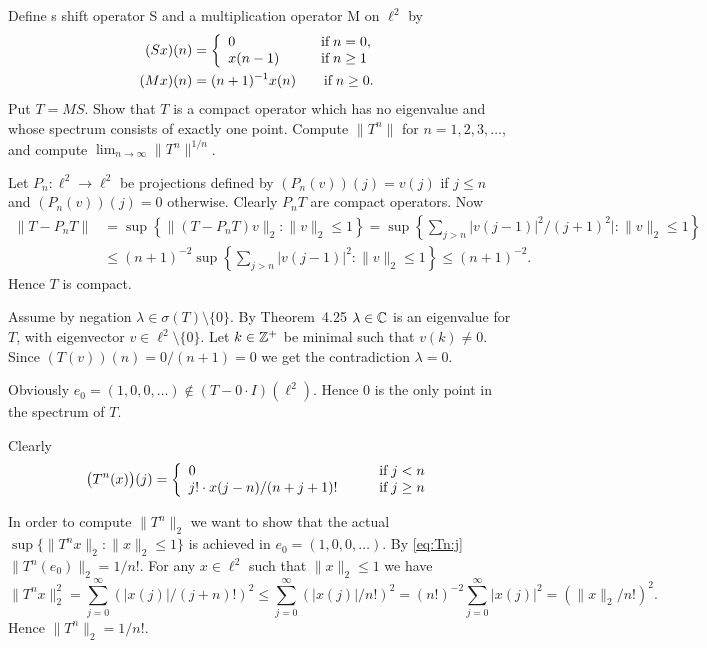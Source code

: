 \begin{enumerate}
\begin{excopy}
Define s shift operator S and a multiplication operator M on \(\ell^2\) by
\begin{align*}
(Sx)(n) &= 
\left\{
 \begin{array}{ll}
 0 & \qquad \textnormal{if}\; n = 0,\\
 x(n-1) & \qquad \textnormal{if}\; n \geq 1
 \end{array} 
\right.\\
(Mx)(n) &= (n+1)^{-1}x(n) \qquad \textnormal{if}\; n \geq 0.
\end{align*}
Put \(T = MS\). Show that $T$ is a compact operator which has no eigenvalue
 and whose
spectrum consists of exactly one point.
 Compute \(\|T^n\|\) for \(n=1,2,3,\ldots\), and compute
\(\lim_{n\to\infty} \|T^n\|^{1/n}\).
\end{excopy}

Let \(P_n:\ell^2\to\ell^2\) be projections defined by
\((P_n(v))(j) = v(j)\) if \(j\leq n\) and 
\((P_n(v))(j) = 0\) otherwise.
Clearly \(P_nT\) are compact operators.
Now
\begin{align*}
\|T-P_nT\| 
&= \sup\left\{\|(T-P_nT)v\|_2: \|v\|_2 \leq 1\right\}
 = \sup\left\{\sum_{j>n} |v(j-1)|^2/(j+1)^2|: \|v\|_2 \leq 1\right\} \\
&\leq (n+1)^{-2} \sup\left\{\sum_{j>n} |v(j-1)|^2: \|v\|_2 \leq 1\right\}
 \leq (n+1)^{-2}.
\end{align*}
Hence $T$ is compact.

Assume by negation \(\lambda \in \sigma(T)\setminus\{0\}\).
By Theorem~4.25
\(\lambda\in\mathbb{C}\) is an eigenvalue for $T$, 
with eigenvector \(v\in \ell^2\setminus\{0\}\).
Let \(k\in\mathbb{Z}^+\) be minimal such that \(v(k)\neq 0\).
Since \((T(v))(n) = 0/(n+1) = 0\) we get the contradiction \(\lambda = 0\).

Obviously \(e_0 = (1,0,0,\ldots) \notin (T-0\cdot I)(\ell^2)\).
Hence $0$ is the only point in the spectrum of $T$.

Clearly
\begin{equation} \label{eq:Tn:j}
\bigl(T^n(x)\bigr)(j) = \left\{
\begin{array}{ll}
0 \qquad &\textnormal{if}\; j < n \\
j!\cdot x(j - n)/(n + j + 1)! \qquad &\textnormal{if}\; j \geq n
\end{array}\right.
\end{equation}

In order to compute \(\|T^n\|_2\) we want to show that 
the actual \(\sup \{\|T^n x\|_2: \|x\|_2\leq 1\}\)
is achieved in \(e_0 = (1,0,0,\ldots)\).
By \eqref{eq:Tn:j} \(\|T^n(e_0)\|_2 = 1/n!\).
For any \(x \in \ell^2\) such that \(\|x\|_2\leq 1\) we have
\begin{equation*}
\|T^nx\|_2^2 
= \sum_{j=0}^\infty (|x(j)|/(j+n)!)^2 
\leq \sum_{j=0}^\infty (|x(j)|/n!)^2 
= (n!)^{-2}\sum_{j=0}^\infty |x(j)|^2 
= (\|x\|_2/n!)^2.
\end{equation*}
Hence \(\|T^n\|_2 = 1/n!\).


\end{enumerate}
